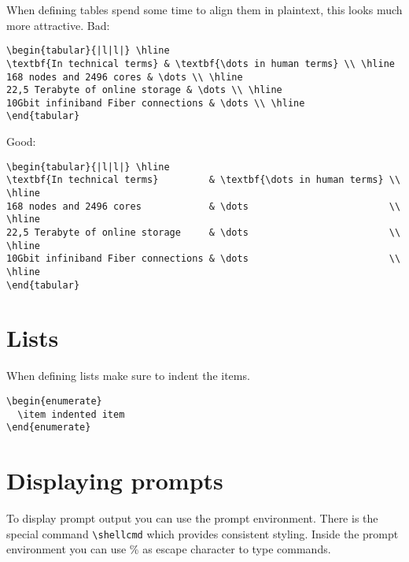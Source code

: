 \documentclass[11pt,a4paper,oneside]{book}
\begin{document}
When defining tables spend some time to align them in plaintext, this looks much more attractive.
Bad:
\begin{verbatim}
\begin{tabular}{|l|l|} \hline
\textbf{In technical terms} & \textbf{\dots in human terms} \\ \hline
168 nodes and 2496 cores & \dots \\ \hline
22,5 Terabyte of online storage & \dots \\ \hline
10Gbit infiniband Fiber connections & \dots \\ \hline
\end{tabular}
\end{verbatim}

Good:
\begin{verbatim}
\begin{tabular}{|l|l|} \hline
\textbf{In technical terms}         & \textbf{\dots in human terms} \\ \hline
168 nodes and 2496 cores            & \dots                         \\ \hline
22,5 Terabyte of online storage     & \dots                         \\ \hline
10Gbit infiniband Fiber connections & \dots                         \\ \hline
\end{tabular}
\end{verbatim}

\section{Lists}
\label{sec:lists}

When defining lists make sure to indent the items.

\begin{verbatim}
\begin{enumerate}
  \item indented item
\end{enumerate}
\end{verbatim}

\section{Displaying prompts}
\label{sec:displaying-prompts}

To display prompt output you can use the prompt environment. There is the
special command \texttt{\textbackslash{}shellcmd{}} which provides consistent
styling. Inside the prompt environment you can use \% as escape character to
type commands.
\end{document}
